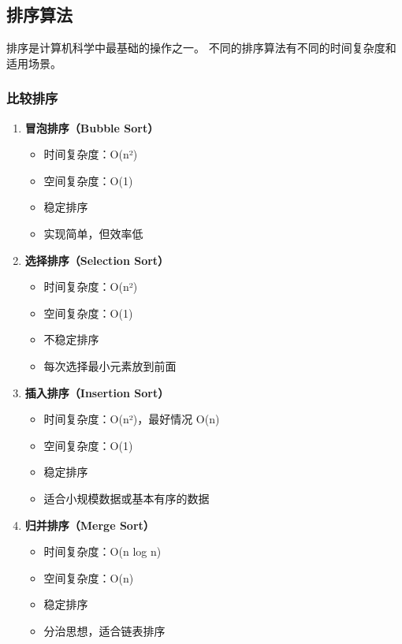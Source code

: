 \subsection{排序算法}

排序是计算机科学中最基础的操作之一。
不同的排序算法有不同的时间复杂度和适用场景。

\subsubsection{比较排序}

\begin{enumerate}
  \item \textbf{冒泡排序（Bubble Sort）}
    \begin{itemize}
      \item 时间复杂度：O(n²)
      \item 空间复杂度：O(1)
      \item 稳定排序
      \item 实现简单，但效率低
    \end{itemize}

  \item \textbf{选择排序（Selection Sort）}
    \begin{itemize}
      \item 时间复杂度：O(n²)
      \item 空间复杂度：O(1)
      \item 不稳定排序
      \item 每次选择最小元素放到前面
    \end{itemize}

  \item \textbf{插入排序（Insertion Sort）}
    \begin{itemize}
      \item 时间复杂度：O(n²)，最好情况 O(n)
      \item 空间复杂度：O(1)
      \item 稳定排序
      \item 适合小规模数据或基本有序的数据
    \end{itemize}

  \item \textbf{归并排序（Merge Sort）}
    \begin{itemize}
      \item 时间复杂度：O(n log n)
      \item 空间复杂度：O(n)
      \item 稳定排序
      \item 分治思想，适合链表排序
    \end{itemize}


\end{enumerate}

